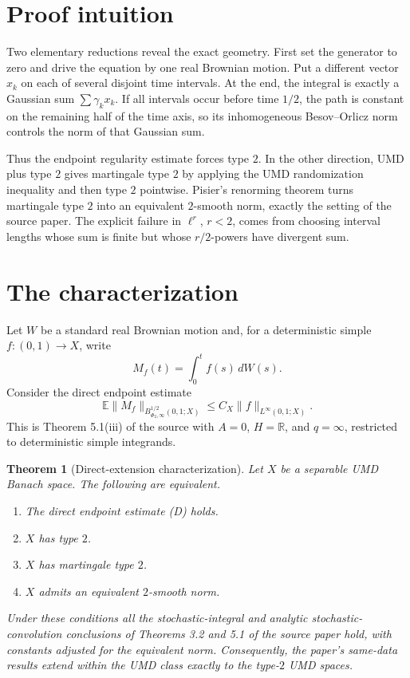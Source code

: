 \documentclass[11pt]{article}
\newtheorem{theorem}{Theorem}
\newcommand{\E}{\mathbb E}
\newcommand{\R}{\mathbb R}
\newcommand{\PhiTwo}{\Phi_2}
\begin{document}
\section{Proof intuition}

Two elementary reductions reveal the exact geometry.  First set the generator
to zero and drive the equation by one real Brownian motion.  Put a different
vector $x_k$ on each of several disjoint time intervals.  At the end, the
integral is exactly a Gaussian sum $\sum\gamma_kx_k$.  If all intervals occur
before time $1/2$, the path is constant on the remaining half of the time
axis, so its inhomogeneous Besov--Orlicz norm controls the norm of that
Gaussian sum.

Thus the endpoint regularity estimate forces type $2$.  In the other
direction, UMD plus type $2$ gives martingale type $2$ by applying the UMD
randomization inequality and then type $2$ pointwise.  Pisier's renorming
theorem turns martingale type $2$ into an equivalent $2$-smooth norm, exactly
the setting of the source paper.  The explicit failure in $\ell^r$, $r<2$,
comes from choosing interval lengths whose sum is finite but whose
$r/2$-powers have divergent sum.

\section{The characterization}

Let $W$ be a standard real Brownian motion and, for a deterministic simple
$f:(0,1)\to X$, write
\[
 M_f(t)=\int_0^t f(s)\,dW(s).
\]
Consider the direct endpoint estimate
\begin{equation}
 \E\|M_f\|_{B^{1/2}_{\PhiTwo,\infty}(0,1;X)}
 \le C_X\|f\|_{L^\infty(0,1;X)}.                 \tag{D}
\end{equation}
This is Theorem 5.1(iii) of the source with $A=0$, $H=\R$, and $q=\infty$,
restricted to deterministic simple integrands.

\begin{theorem}[Direct-extension characterization]
Let $X$ be a separable UMD Banach space.  The following are equivalent.
\begin{enumerate}
\item The direct endpoint estimate \emph{(D)} holds.
\item $X$ has type $2$.
\item $X$ has martingale type $2$.
\item $X$ admits an equivalent $2$-smooth norm.
\end{enumerate}
Under these conditions all the stochastic-integral and analytic
stochastic-convolution conclusions of Theorems 3.2 and 5.1 of the source paper
hold, with constants adjusted for the equivalent norm.  Consequently, the
paper's same-data results extend within the UMD class exactly to the type-$2$
UMD spaces.
\end{theorem}
\end{document}
